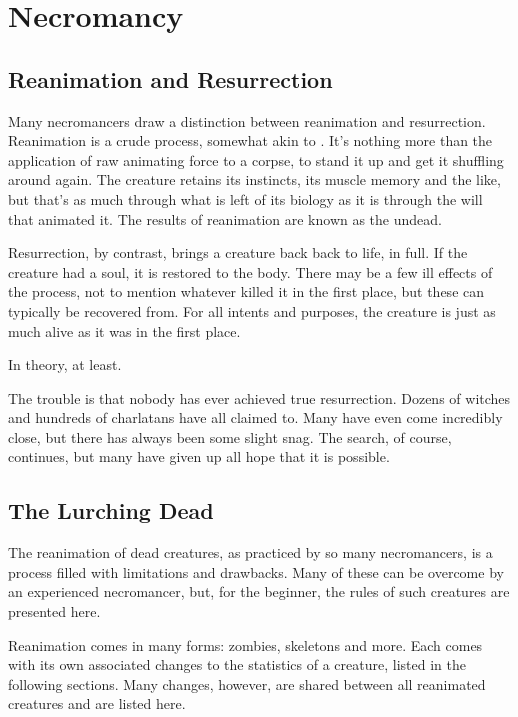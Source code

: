 \chapter{Necromancy}

\section{Reanimation and Resurrection}

Many necromancers draw a distinction between reanimation and resurrection.
Reanimation is a crude process, somewhat akin to .
It's nothing more than the application of raw animating force to a corpse, to stand it up and get it shuffling around again.
The creature retains its instincts, its muscle memory and the like, but that's as much through what is left of its biology as it is through the will that animated it.
The results of reanimation are known as the undead.

Resurrection, by contrast, brings a creature back back to life, in full.
If the creature had a soul, it is restored to the body.
There may be a few ill effects of the process, not to mention whatever killed it in the first place, but these can typically be recovered from.
For all intents and purposes, the creature is just as much alive as it was in the first place.

In theory, at least.

The trouble is that nobody has ever achieved true resurrection.
Dozens of witches and hundreds of charlatans have all claimed to.
Many have even come incredibly close, but there has always been some slight snag.
The search, of course, continues, but many have given up all hope that it is possible.

\section{The Lurching Dead}

The reanimation of dead creatures, as practiced by so many necromancers, is a process filled with limitations and drawbacks.
Many of these can be overcome by an experienced necromancer, but, for the beginner, the rules of such creatures are presented here.

Reanimation comes in many forms: zombies, skeletons and more.
Each comes with its own associated changes to the statistics of a creature, listed in the following sections.
Many changes, however, are shared between all reanimated creatures and are listed here.


